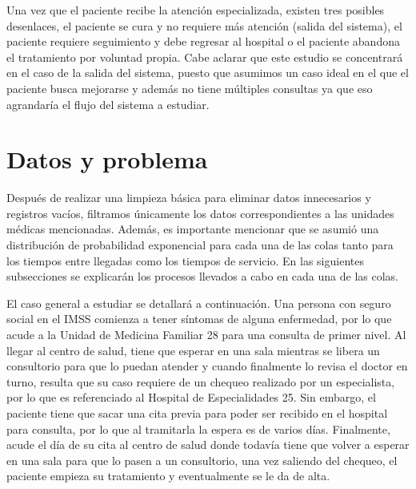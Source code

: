 \documentclass[10pt]{article}
\begin{document}
    Una vez que el paciente recibe la atención especializada, existen tres posibles desenlaces, el paciente se cura y no requiere más atención (salida del sistema), el paciente requiere seguimiento y debe regresar al hospital o el paciente abandona el tratamiento por voluntad propia. Cabe aclarar que este estudio se concentrará en el caso de la salida del sistema, puesto que asumimos un caso ideal en el que el paciente busca mejorarse y además no tiene múltiples consultas ya que eso agrandaría el flujo del sistema a estudiar.

    \section{Datos y problema}
    Después de realizar una limpieza básica para eliminar datos innecesarios y registros vacíos, filtramos únicamente los datos correspondientes a las unidades médicas mencionadas. Además, es importante mencionar que se asumió una distribución de probabilidad exponencial para cada una de las colas tanto para los tiempos entre llegadas como los tiempos de servicio. En las siguientes subsecciones se explicarán los procesos llevados a cabo en cada una de las colas.
    
    El caso general a estudiar se detallará a continuación. Una persona con seguro social en el IMSS comienza a tener síntomas de alguna enfermedad, por lo que acude a la Unidad de Medicina Familiar 28 para una consulta de primer nivel. Al llegar al centro de salud, tiene que esperar en una sala mientras se libera un consultorio para que lo puedan atender y cuando finalmente lo revisa el doctor en turno, resulta que su caso requiere de un chequeo realizado por un especialista, por lo que es referenciado al Hospital de Especialidades 25. Sin embargo, el paciente tiene que sacar una cita previa para poder ser recibido en el hospital para consulta, por lo que al tramitarla la espera es de varios días. Finalmente, acude el día de su cita al centro de salud donde todavía tiene que volver a esperar en una sala para que lo pasen a un consultorio, una vez saliendo del chequeo, el paciente empieza su tratamiento y eventualmente se le da de alta.
    
\end{document}
